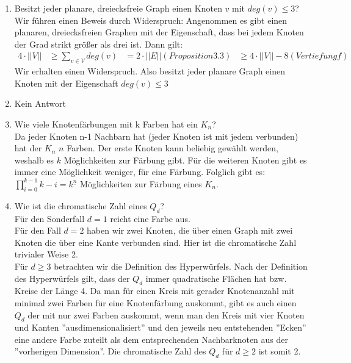 \begin{enumerate}[label=(\alph*)]
        \item Besitzt jeder planare, dreiecksfreie Graph einen Knoten $v$ mit $deg(v) \leq 3$? \\
        Wir führen einen Beweis durch Widerspruch: Angenommen es gibt einen planaren, dreiecksfreien 
        Graphen mit der Eigenschaft, dass bei jedem Knoten der Grad strikt größer als drei ist. Dann gilt: 
        \begin{align*}
            4 \cdot ||V|| &\geq \sum_{v \in V} deg(v)
            &= 2 \cdot ||E|| (Proposition 3.3)
            &\geq 4 \cdot ||V|| - 8 (Vertiefung f)
        \end{align*}
        Wir erhalten einen Widerspruch. Also besitzt jeder planare Graph einen Knoten mit der Eigenschaft $deg(v) \leq 3$
        
        \item Kein Antwort

        \item Wie viele Knotenfärbungen mit k Farben hat ein $K_n$? \\
        Da jeder Knoten n-1 Nachbarn hat (jeder Knoten ist mit jedem verbunden) hat der $K_n$ $n$ Farben. 
        Der erste Knoten kann beliebig gewählt werden, weshalb es $k$ Möglichkeiten zur Färbung gibt. 
        Für die weiteren Knoten gibt es immer eine Möglichkeit weniger, für eine Färbung. Folglich gibt es: \\
        $\prod_{i=0}^{k-1} k - i = k^{\underline{n}}$ Möglichkeiten zur Färbung eines $K_n$.
          
        \item Wie ist die chromatische Zahl eines $Q_d$? \\
        Für den Sonderfall $d = 1$ reicht eine Farbe aus. \\
        Für den Fall $d = 2$ haben wir zwei Knoten, die über einen Graph mit zwei Knoten die über eine 
        Kante verbunden sind. Hier ist die chromatische Zahl trivialer Weise 2.\\
        Für $d \geq 3$ betrachten wir die Definition des Hyperwürfels. Nach der Definition des 
        Hyperwürfels gilt, dass der $Q_d$ immer quadratische Flächen hat bzw. Kreise der Länge 4. 
        Da man für einen   Kreis mit gerader Knotenanzahl mit minimal zwei Farben für eine Knotenfärbung 
        auskommt, gibt es auch einen $Q_d$ der mit nur zwei Farben auskommt, wenn man den Kreis mit vier 
        Knoten und Kanten ''ausdimensionalisiert'' und den jeweils neu entstehenden ''Ecken'' eine 
        andere Farbe zuteilt als dem entsprechenden Nachbarknoten aus der ''vorherigen Dimension''. 
        Die chromatische Zahl des $Q_d$ für $d \geq 2$ ist somit 2.
        
    \end{enumerate}
